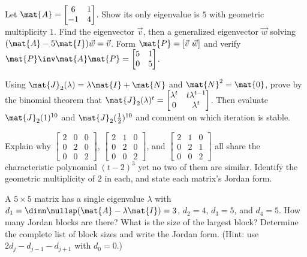 \begin{exercise}
\label{ch28:ex-chain}
Let $\mat{A}=\begin{bmatrix}6&1\\-1&4\end{bmatrix}$. Show its only eigenvalue is $5$ with
geometric multiplicity $1$. Find the eigenvector $\vec{v}$, then a generalized
eigenvector $\vec{w}$ solving $(\mat{A}-5\mat{I})\vec{w}=\vec{v}$. Form
$\mat{P}=[\vec{v}\ \vec{w}]$ and verify $\mat{P}\inv\mat{A}\mat{P}=\begin{bmatrix}5&1\\0&5\end{bmatrix}$.
\end{exercise}

\begin{exercise}
\label{ch28:ex-powers}
Using $\mat{J}_2(\lambda)=\lambda\mat{I}+\mat{N}$ and $\mat{N}^2=\mat{0}$, prove by the
binomial theorem that $\mat{J}_2(\lambda)^t=\begin{bmatrix}\lambda^t & t\lambda^{t-1}\\
0&\lambda^t\end{bmatrix}$. Then evaluate $\mat{J}_2(1)^{10}$ and $\mat{J}_2(\tfrac12)^{10}$
and comment on which iteration is stable.
\end{exercise}

\begin{exercise}
\label{ch28:ex-notsimilar}
Explain why $\begin{bmatrix}2&0&0\\0&2&0\\0&0&2\end{bmatrix}$,
$\begin{bmatrix}2&1&0\\0&2&0\\0&0&2\end{bmatrix}$, and
$\begin{bmatrix}2&1&0\\0&2&1\\0&0&2\end{bmatrix}$ all share the characteristic polynomial
$(t-2)^3$ yet no two of them are similar. Identify the geometric multiplicity of $2$ in
each, and state each matrix's Jordan form.
\end{exercise}

\begin{exercise}
\label{ch28:ex-nullities}
A $5\times5$ matrix has a single eigenvalue $\lambda$ with
$d_1=\dimn\nullsp(\mat{A}-\lambda\mat{I})=3$, $d_2=4$, $d_3=5$, and $d_4=5$. How many
Jordan blocks are there? What is the size of the largest block? Determine the complete
list of block sizes and write the Jordan form. (Hint: use
$2d_j-d_{j-1}-d_{j+1}$ with $d_0=0$.)
\end{exercise}

